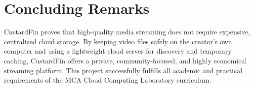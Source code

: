 \section{Concluding Remarks}
\label{sec:conclusion_remarks}

CustardFin proves that high-quality media streaming does not require expensive, centralized cloud storage. By keeping video files safely on the creator's own computer and using a lightweight cloud server for discovery and temporary caching, CustardFin offers a private, community-focused, and highly economical streaming platform. This project successfully fulfills all academic and practical requirements of the MCA Cloud Computing Laboratory curriculum.
